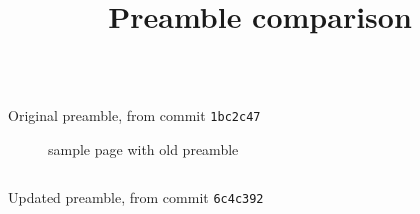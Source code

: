 \documentclass[a4paper,11pt]{article}
\title{Preamble comparison}
\newenvironment{longlisting}
{\addvspace{\baselineskip}\captionsetup{type=listing}}
{\addvspace{\baselineskip}}
\begin{document}
    \maketitle

\begin{longlisting}
\inputminted{latex}{original_preamble}
\caption{Original preamble, from commit \texttt{1bc2c47}}
\end{longlisting}

\begin{figure}[H]
\begin{center}
\end{center}
\caption{sample page with old preamble}
\end{figure}

\newpage

\begin{longlisting}
\inputminted{latex}{new_preamble}
\caption{Updated preamble, from commit \texttt{6c4c392}}
\end{longlisting}
\end{document}
